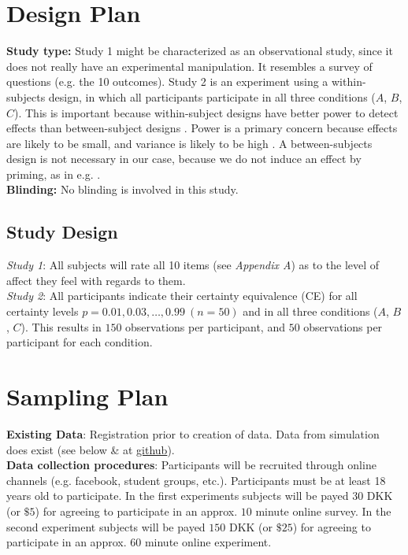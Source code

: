 \documentclass[12pt]{article}
\begin{document}
 \section{Design Plan}

\textbf{Study type:} Study 1 might be characterized
as an observational study, since it does not
really have an experimental manipulation. It
resembles a survey of questions (e.g. the 10
outcomes). Study 2 is an experiment using a
within-subjects design, in which all participants
participate in all three conditions ($A$,  $B$,  $C$).
This is important because within-subject designs
have better power to detect effects than
between-subject designs
\autocite{charness2012experimental}. Power is a
primary concern because effects are likely
to be small, and variance is likely to be high
\autocite{gonzalez1999shape}. A between-subjects
design is not necessary in our case, because we do
not induce an effect by priming, as in e.g.
\textcite{hsee2004music}. \\

\textbf{Blinding:} No blinding is involved in this study. \\

\subsection{Study Design}

\emph{Study 1}: All subjects will rate all 10 items
(see \emph{Appendix A}) as to the level of affect they
feel with regards to them. \\

\emph{Study 2}: All participants
indicate their certainty equivalence (CE) for all
certainty levels $p = 0.01, 0.03, \ldots, 0.99 \: (n = 50)$
and in all three conditions ($A$,  $B$,  $C$).
This results in $150$ observations per participant,
and  $50$ observations per participant for each
condition.

\section{Sampling Plan}

\textbf{Existing Data}: Registration prior
to creation of data. Data from simulation
does exist (see below \& at
\href{https://github.com/victor-m-p/BayesianDecisionWeights}{github}). \\

\textbf{Data collection procedures}:
Participants will be recruited through online
channels (e.g. facebook, student groups, etc.).
Participants must be at least 18 years old to
participate. In the first experiments subjects
will be payed $30$ DKK (or $\$5$)
for agreeing to participate
in an approx. $10$ minute online survey. In the
second experiment subjects will be payed $150$ DKK
(or $\$25$)
for agreeing to participate in an approx. $60$ minute
online experiment. \\
\end{document}

